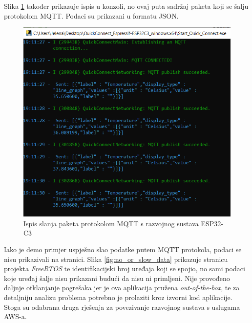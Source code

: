 Slika \ref{fig:esp32_easy_connect_mqtt_packages} također prikazuje ispis u konzoli, no ovaj puta sadržaj paketa koji se šalju protokolom MQTT. Podaci su prikazani u formatu JSON.

\begin{figure}[ht]
	\centering
	\includegraphics[scale=0.6]{imgs/esp32_easy_connect_mqtt_packages}
	\caption{Ispis slanja paketa protokolom MQTT s razvojnog sustava ESP32-C3}
	\label{fig:esp32_easy_connect_mqtt_packages}
\end{figure}

Iako je demo primjer uspješno slao podatke putem MQTT protokola, podaci se nisu prikazivali na stranici. Slika \ref{fig:no_or_slow_data} prikazuje stranicu projekta \textit{FreeRTOS} te identifikacijski broj uređaja koji se spojio, no sami podaci koje uređaj šalje nisu prikazani budući da nisu ni primljeni. Nije provođeno daljnje otklanjanje pogrešaka jer je ova aplikacija pružena \textit{out-of-the-box}, te za detaljniju analizu problema potrebno je prolaziti kroz izvorni kod aplikacije. Stoga su odabrana druga rješenja za povezivanje razvojnog sustava s uslugama AWS-a.


